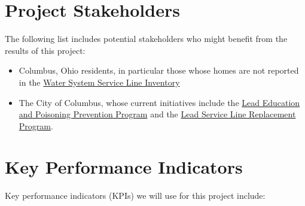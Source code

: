 \documentclass{article}
\newcommand{\Katherine}[1]{{\textcolor{ForestGreen}{\bfseries{[#1]}}}}
\begin{document}
\section{Project Stakeholders}

The following list includes potential stakeholders who might benefit from the results of this project: 
\begin{itemize}
    \item Columbus, Ohio residents, in particular those whose homes are not reported in the \href{https://experience.arcgis.com/experience/1ddfc9ee51ae4eddbdf8003c81eef7e4/}{Water System Service Line Inventory} 
    \item 
    The City of Columbus, whose current initiatives include the \href{https://www.columbus.gov/Services/Public-Health/Environmental-Health/Lead-Education-and-Poisoning-Prevention}{Lead Education and Poisoning Prevention Program} and the \href{https://www.columbus.gov/Services/Columbus-Water-Power/About-Columbus-Water-Power/The-Division-of-Water/Water-Facts/Water-Health/Lead-Service-Program-Information}{Lead Service Line Replacement Program}.
    
\end{itemize}

\section{Key Performance Indicators}


Key performance indicators (KPIs) we will use for this project include:
\end{document}
